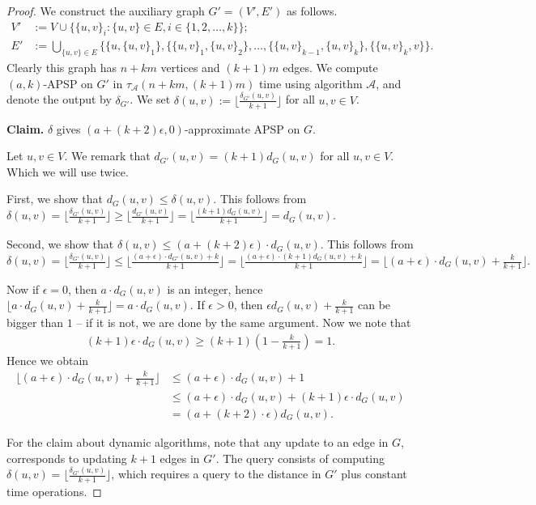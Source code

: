 \documentclass[11pt]{article}
\theoremstyle{definition}
\theoremstyle{remark}
\begin{document}
\thmreduction*
\begin{proof}
    We construct the auxiliary graph $G'=(V',E')$ as follows.
    \begin{align*}
        V' &:= V \cup \{ \{u,v\}_i : \{u,v\}\in E, i\in\{1, 2, \dots, k\}\}; \\
        E' &:= \bigcup_{\{u,v\}\in E} \{ \{u, \{u,v\}_1\}, \{\{u,v\}_1,\{u,v\}_2\}, \dots, \{\{u,v\}_{k-1},\{u,v\}_k\}, \{\{u,v\}_k, v\} \}.
    \end{align*}
    Clearly this graph has $n+km$ vertices and $(k+1)m$ edges. We compute $(a,k)$-APSP on $G'$ in $\tau_{\mathcal A}(n+km,(k+1)m)$ time using algorithm $\mathcal{A}$, and denote the output by $\delta_{G'}$.
    We set $\delta(u,v) := \lfloor \tfrac{\delta_{G'}(u,v)}{k+1}\rfloor$ for all $u,v\in V$. 

    \textbf{Claim.} $\delta$ gives $(a+(k+2)\epsilon,0)$-approximate APSP on $G$. 

    Let $u,v\in V$. We remark that $d_{G'}(u,v)=(k+1)d_G(u,v)$ for all $u,v\in V$. Which we will use twice. %
    
    First, we show that $d_G(u,v)\leq \delta(u,v)$.  This follows from $\delta(u,v) = \lfloor \tfrac{\delta_{G'}(u,v)}{k+1}\rfloor \geq \lfloor \tfrac{d_{G'}(u,v)}{k+1}\rfloor = \lfloor \tfrac{(k+1)d_G(u,v)}{k+1}\rfloor=d_G(u,v)$. 

    Second, we show that $\delta(u,v) \leq (a+(k+2)\epsilon)\cdot d_G(u,v)$. This follows from
    $$\delta(u,v) = \lfloor \tfrac{\delta_{G'}(u,v)}{k+1}\rfloor \leq \lfloor \tfrac{(a+\epsilon)\cdot d_{G'}(u,v)+k}{k+1}\rfloor = \lfloor \tfrac{(a+\epsilon)\cdot (k+1)d_{G}(u,v)+k}{k+1}\rfloor= \lfloor (a+\epsilon)\cdot d_G(u,v) +\tfrac{k}{k+1}\rfloor.$$

    Now if $\epsilon=0$, then $a\cdot d_G(u,v)$ is an integer, hence $\lfloor a\cdot d_G(u,v) +\tfrac{k}{k+1}\rfloor = a\cdot d_G(u,v) $. If $\epsilon>0$, then $\epsilon d_G(u,v)+ \tfrac{k}{k+1}$ can be bigger than $1$ -- if it is not, we are done by the same argument. Now we note that 
    \begin{align*}
        (k+1)\epsilon\cdot d_G(u,v) \geq (k+1)\left(1-\tfrac{k}{k+1}\right) =1.
    \end{align*}
    Hence we obtain 
    \begin{align*}
        \lfloor (a+\epsilon)\cdot d_G(u,v) +\tfrac{k}{k+1}\rfloor &\leq (a+\epsilon)\cdot d_G(u,v) +1 \\
        &\leq (a+\epsilon)\cdot d_G(u,v) + (k+1)\epsilon\cdot d_G(u,v)\\
        &= (a+(k+2)\cdot \epsilon)d_G(u,v).
    \end{align*}
    

    For the claim about dynamic algorithms, note that any update to an edge in $G$, corresponds to updating $k+1$ edges in $G'$. The query consists of computing $\delta(u,v) = \lfloor \tfrac{\delta_{G'}(u,v)}{k+1}\rfloor$, which requires a query to the distance in $G'$ plus constant time operations. 
\end{proof}
\end{document}
